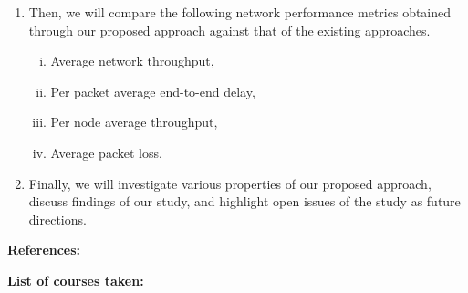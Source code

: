 \documentclass[12pt,addpoints,fleqn]{exam}
\begin{document}
\begin{questions}
\begin{enumerate}
    \item Then, we will compare the following network performance metrics obtained through our proposed approach against that of the existing approaches.
    \begin{enumerate}[i.]
        \item Average network throughput,
        \item Per packet average end-to-end delay,
        \item Per node average throughput,
        \item Average packet loss.
    \end{enumerate}
    \item Finally, we will investigate various properties of our proposed approach, discuss findings of our study, and highlight open issues of the study as future directions.
\end{enumerate}
{\bfseries \question \textbf{References:}}
\vspace{-1.75cm}
\renewcommand\refname{}
%
%
%
{%

}
{\bfseries \question
\textbf{List of courses taken:}}


\end{questions}
\end{document}
